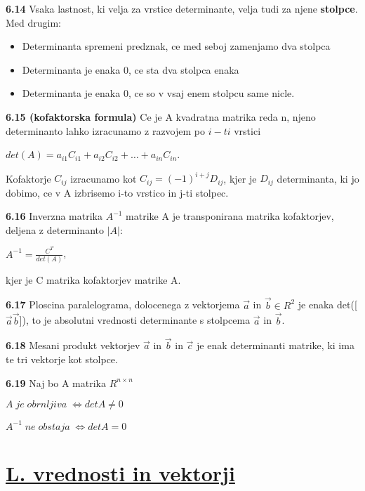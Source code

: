 \documentclass{article}
\begin{document}
\begin{multicols}{3}
\textbf{6.14} Vsaka lastnost, ki velja za vrstice determinante, velja tudi
za njene \textbf{stolpce}. Med drugim:
\begin{itemize}
    \item Determinanta spremeni predznak, ce med seboj zamenjamo dva stolpca
    \item Determinanta je enaka 0, ce sta dva stolpca enaka
    \item Determinanta je enaka 0, ce so v vsaj enem stolpcu same nicle.
\end{itemize}

\textbf{6.15 (kofaktorska formula)} Ce je A kvadratna matrika reda n,
njeno determinanto lahko izracunamo z razvojem po $i-ti$ vrstici
\begin{center}
    $det(A) = a_{i1}C_{i1} + a_{i2}C_{i2} + \hdots + a_{in}C_{in}$.
\end{center}
Kofaktorje $C_{ij}$ izracunamo kot $C_{ij} = (-1)^{i+j}D_{ij}$, kjer je $D_{ij}$ determinanta,
ki jo dobimo, ce v A izbrisemo i-to vrstico in j-ti stolpec.

\textbf{6.16} Inverzna matrika $A^{-1}$ matrike A je transponirana matrika kofaktorjev,
deljena z determinanto $|A|$:
\begin{center}
    $A^{-1} = \frac{C^{T}}{det(A)}$,
\end{center}
kjer je C matrika kofaktorjev matrike A.

\textbf{6.17} Ploscina paralelograma, dolocenega z vektorjema $\vec{a}$ in $\vec{b} \in R^{2}$ je
enaka det([$\vec{a} \vec{b}$]), to je absolutni vrednosti determinante s stolpcema $\vec{a}$ in $\vec{b}$.

\textbf{6.18} Mesani produkt vektorjev $\vec{a}$ in $\vec{b}$ in $\vec{c}$ je enak determinanti matrike, ki 
ima te tri vektorje kot stolpce.

\textbf{6.19} Naj bo A matrika $R^{n\times n}$
\begin{center}
    \begin{math}
        A\; je\; obrnljiva\; \iff detA \neq 0
    \end{math}
\end{center}
\begin{center}
    \begin{math}
        A^{-1}\; ne\; obstaja\; \iff detA = 0
    \end{math}
\end{center}

\section{\underline{L. vrednosti in vektorji}}


\end{multicols}
\end{document}
